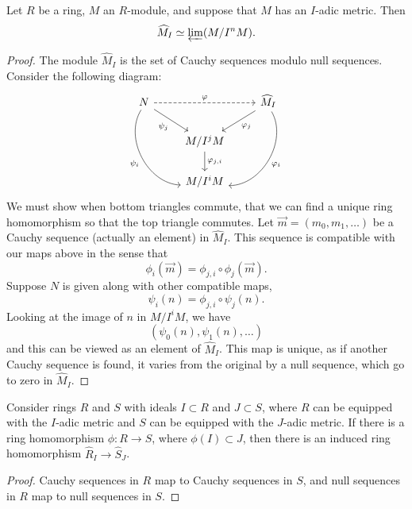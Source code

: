 \documentclass{ximera}
\begin{document}
\begin{theorem}
  Let $R$ be a ring, $M$ an $R$-module, and suppose that $M$ has an
  $I$-adic metric. Then
  \[
  \widehat{M}_I \simeq \varprojlim(M/I^n M).
  \]
  \begin{proof}
    The module $\hat{M}_I$ is the set of Cauchy sequences modulo null
    sequences.  Consider the following diagram:
    \[
    \begin{tikzcd}
      N\ar[ddr,bend right=60,swap,"\psi_i"] \ar[dr,swap,"\psi_j"]  \ar[dashed,rr,"\ph"] &   &  \hat{M}_{I} \ar[ddl,bend left=60,"\ph_i"] \ar[dl,"\ph_j"]\\
      & M/I^jM \ar[d,"\ph_{j,i}"] &\\
      & M/I^iM &
    \end{tikzcd}
    \]
    We must show when bottom triangles commute, that we can find a
    unique ring homomorphism so that the top triangle commutes. Let
    $\vec{m}=(m_0,m_1,\dots)$ be a Cauchy sequence (actually an element) in
    $\hat{M}_I$. This sequence is compatible with our maps above in
    the sense that
    \[
    \phi_i(\vec{m}) = \phi_{j,i} \circ \phi_j(\vec{m}).
    \]
    Suppose $N$ is given along with other compatible maps,
    \[
    \psi_i(n) = \phi_{j,i}\circ \psi_j(n).
    \]
    Looking at the image of $n$ in $M/I^iM$, we have
    \[
    (\psi_0(n), \psi_1(n),\dots)
    \]
    and this can be viewed as an element of $\hat{M}_{I}$. This map is
    unique, as if another Cauchy sequence is found, it varies from the
    original by a null sequence, which go to zero in $\hat{M}_{I}$.
  \end{proof}
\end{theorem}







\begin{proposition}
  Consider rings $R$ and $S$ with ideals $I\subset R$ and $J\subset
  S$, where $R$ can be equipped with the $I$-adic metric and $S$ can
  be equipped with the $J$-adic metric. If there is a ring
  homomorphism $\phi:R \to S$, where $\phi(I) \subset J$, then there
  is an induced ring homomorphism $\hat{R}_I\to \hat{S}_J$.
  \begin{proof}
    Cauchy sequences in $R$ map to Cauchy sequences in $S$, and null
    sequences in $R$ map to null sequences in $S$.
  \end{proof}
\end{proposition}
\end{document}
